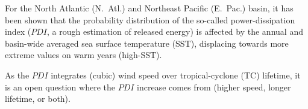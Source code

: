 
For the North Atlantic (N.~Atl.) and Northeast Pacific (E.~Pac.) basin, it has been shown \cite{Corral2010} that the probability distribution of the so-called power-dissipation index ($PDI$, a rough estimation of released energy) is affected by the annual and basin-wide averaged sea surface temperature (SST), displacing towards more extreme values on warm years (high-SST).

As the $PDI$ integrates (cubic) wind speed over tropical-cyclone (TC) lifetime, it is an open question where the $PDI$ increase comes from (higher speed, longer lifetime, or both).






